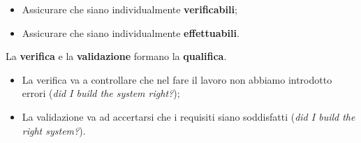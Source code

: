 \begin{itemize}

	\item Assicurare che siano individualmente \textbf{verificabili};
	\item Assicurare che siano individualmente \textbf{effettuabili}.

\end{itemize}

La \textbf{verifica} e la \textbf{validazione} formano la \textbf{qualifica}.

\begin{itemize}

	\item La verifica va a controllare che nel fare il lavoro non abbiamo introdotto errori (\textit{did I build the system right?});
	\item La validazione va ad accertarsi che i requisiti siano soddisfatti (\textit{did I build the right system?}).

\end{itemize}